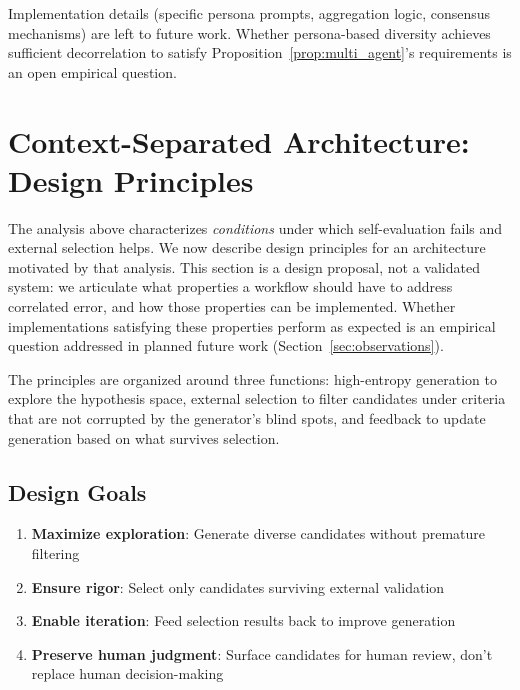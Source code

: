 \documentclass[11pt]{article}
\begin{document}
Implementation details (specific persona prompts, aggregation logic, consensus mechanisms)
are left to future work. Whether persona-based diversity achieves sufficient decorrelation
to satisfy Proposition~\ref{prop:multi_agent}'s requirements is an open empirical question.

\section{Context-Separated Architecture: Design Principles}
\label{sec:architecture}

The analysis above characterizes \emph{conditions} under which self-evaluation fails and
external selection helps. We now describe design principles for an architecture motivated by
that analysis. This section is a design proposal, not a validated system: we articulate what
properties a workflow should have to address correlated error, and how those properties can
be implemented. Whether implementations satisfying these properties perform as expected is an
empirical question addressed in planned future work (Section~\ref{sec:observations}).

The principles are organized around three functions: high-entropy generation to explore the
hypothesis space, external selection to filter candidates under criteria that are not
corrupted by the generator's blind spots, and feedback to update generation based on what
survives selection.

\subsection{Design Goals}

\begin{enumerate}
    \item \textbf{Maximize exploration}: Generate diverse candidates without premature filtering
    \item \textbf{Ensure rigor}: Select only candidates surviving external validation
    \item \textbf{Enable iteration}: Feed selection results back to improve generation
    \item \textbf{Preserve human judgment}: Surface candidates for human review, don't
    replace human decision-making
\end{enumerate}
\end{document}
